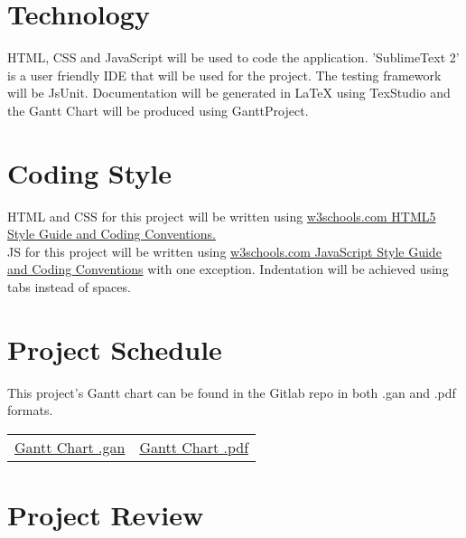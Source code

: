 \documentclass{article}
\begin{document}
	\section{Technology}
	
	HTML, CSS and JavaScript will be used to code the application. 'SublimeText 
	2' is a user 
	friendly
	IDE that will be used for the project. The testing framework will be 
	JsUnit. 
	Documentation will be generated in LaTeX using TexStudio and 
	the Gantt Chart will be produced using GanttProject.
	
	\section{Coding Style}
	
	HTML and CSS for this project will be written using 
	\href{http://www.w3schools.com/html/html5_syntax.asp}
	{w3schools.com HTML5 Style Guide and Coding Conventions.}\\
	
	JS for this project will be written using 
	\href{http://www.w3schools.com/js/js_conventions.asp}
	{w3schools.com JavaScript Style Guide and Coding Conventions} with one 
	exception. Indentation will be achieved using tabs instead of spaces.
	
	\section{Project Schedule}
	 This project's Gantt chart can be found in the Gitlab repo in both .gan 
	 and .pdf formats.
		\begin{table}[H]
			\begin{tabularx}{\textwidth}{cc}		
				\href{https://gitlab.cas.mcmaster.ca/macsidenotes/macsidenotes/blob/master/MacSidenotesProjectSchedule.gan}
				{Gantt Chart .gan} & 
				\href{https://gitlab.cas.mcmaster.ca/macsidenotes/macsidenotes/blob/master/MacSidenotesProjectSchedule.gan}
				{Gantt Chart .pdf}
			\end{tabularx}
		\end{table}
	
	\section{Project Review}
	
\end{document}
